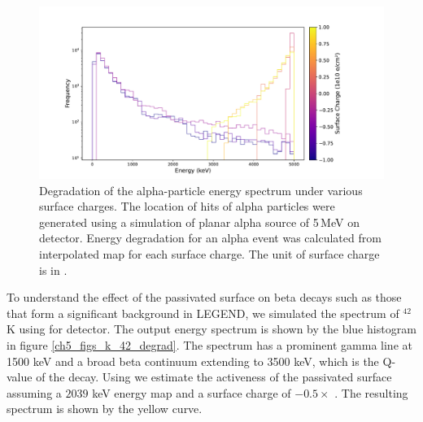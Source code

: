 \begin{figure}%
  \centering
  \includegraphics[trim={2cm 0.5cm 3.5cm 1.7cm},clip,width=0.99\linewidth]{ch5/figs/eng_deg_hist.pdf}
  \caption{Degradation of the alpha-particle energy spectrum under various surface charges. The location of hits of alpha particles were generated using a {\geant} simulation of planar alpha source of 5\,MeV on {\ponama} detector. Energy degradation for an alpha event was calculated from interpolated map for each surface charge. The unit of surface charge is in {\scunit}.}
  \label{fig:eng_spec_degradation}
\end{figure}

To understand the effect of the passivated surface on beta decays such as those that form a significant background in LEGEND, we simulated the spectrum of $^{42}$K using {\geant} for {\ponama} detector. The output energy spectrum is shown by the blue histogram in figure \ref{ch5_figs_k_42_degrad}. The spectrum has a prominent gamma line at 1500 keV and a broad beta continuum extending to 3500 keV, which is the Q-value of the decay. Using {\ehd} we estimate the activeness of the passivated surface assuming a $2039$ keV energy map and a surface charge of $- 0.5 \times$ {\scunit}. The resulting spectrum is shown by the yellow curve.

